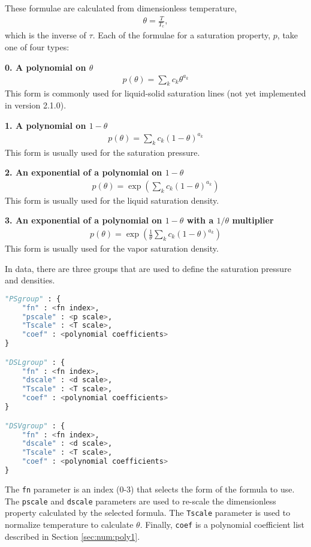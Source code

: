 These formulae are calculated from dimensionless temperature, 
\begin{align}
\theta = \frac{T}{T_c},
\end{align}
which is the inverse of $\tau$.  Each of the formulae for a saturation property, $p$, take one of four types:

{\bf 0. A polynomial on $\theta$} 
\begin{align}
p(\theta) = \sum_k c_k \theta^{a_k}
\end{align}
This form is commonly used for liquid-solid saturation lines (not yet implemented in version 2.1.0).

{\bf 1. A polynomial on $1-\theta$}
\begin{align}
p(\theta) = \sum_k c_k (1-\theta)^{a_k}
\end{align}
This form is usually used for the saturation pressure.

{\bf 2. An exponential of a polynomial on $1-\theta$}
\begin{align}
p(\theta) = \exp \left( \sum_k c_k (1-\theta)^{a_k} \right)
\end{align}
This form is usually used for the liquid saturation density.

{\bf 3. An exponential of a polynomial on $1-\theta$ with a $1/\theta$ multiplier}
\begin{align}
p(\theta) = \exp \left( \frac{1}{\theta} \sum_k c_k (1-\theta)^{a_k} \right)
\end{align}
This form is usually used for the vapor saturation density.

In data, there are three groups that are used to define the saturation pressure and densities.
\begin{lstlisting}[language=Python]
"PSgroup" : {
    "fn" : <fn index>,
    "pscale" : <p scale>,
    "Tscale" : <T scale>,
    "coef" : <polynomial coefficients>
}

"DSLgroup" : {
    "fn" : <fn index>,
    "dscale" : <d scale>,
    "Tscale" : <T scale>,
    "coef" : <polynomial coefficients>
}

"DSVgroup" : {
    "fn" : <fn index>,
    "dscale" : <d scale>,
    "Tscale" : <T scale>,
    "coef" : <polynomial coefficients>
}
\end{lstlisting}

The \texttt{fn} parameter is an index (0-3) that selects the form of the formula to use.  The \texttt{pscale} and \texttt{dscale} parameters are used to re-scale the dimensionless property calculated by the selected formula.  The \texttt{Tscale} parameter is used to normalize temperature to calculate $\theta$.  Finally, \texttt{coef} is a polynomial coefficient list described in Section \ref{sec:num:poly1}.
